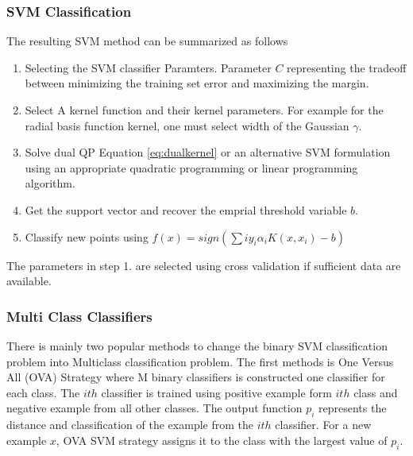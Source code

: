  
\subsubsection{SVM  Classification}
The resulting SVM method can be summarized as follows 
\begin{enumerate}
	\item Selecting the SVM classifier Paramters. Parameter $C$ representing the tradeoff between minimizing the training set error and maximizing the margin. 
	\item Select A kernel function and their kernel parameters. For example for the radial basis function kernel, one must select width of the Gaussian $\gamma$. 
	\item Solve dual QP Equation \ref{eq:dualkernel} or an alternative SVM formulation using an appropriate quadratic programming or linear programming algorithm. 
	\item Get the support vector and recover the emprial threshold  variable $b$. 
	\item Classify new points using $f(x)=sign\left(\sum{i}y_i\alpha_i K\left(x,x_i\right)-b\right)$
\end{enumerate}
The parameters in step 1. are selected using cross validation if sufficient data are available. %
\subsubsection {Multi Class Classifiers}
 
 There is mainly two popular methods to change the binary SVM classification problem into Multiclass classification problem. The first methods is One Versus All (OVA) Strategy where M binary classifiers is constructed one classifier for each class.  The $ith$ classifier is trained using positive example form $ith$ class and negative example from all other classes. The output function $p_i$ represents the distance and classification of the example from the $ith$ classifier. For a new example $x$, OVA SVM strategy assigns it to the class with the largest value of $p_i$. 
 
